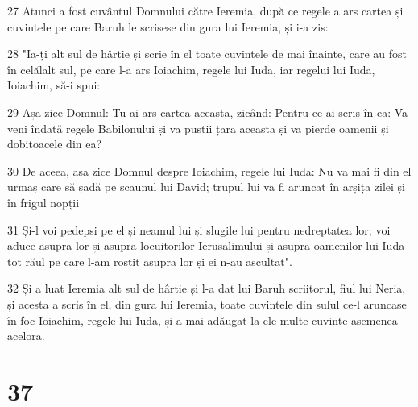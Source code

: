 \par 27 Atunci a fost cuvântul Domnului către Ieremia, după ce regele a ars cartea și cuvintele pe care Baruh le scrisese din gura lui Ieremia, și i-a zis:
\par 28 "Ia-ți alt sul de hârtie și scrie în el toate cuvintele de mai înainte, care au fost în celălalt sul, pe care l-a ars Ioiachim, regele lui Iuda, iar regelui lui Iuda, Ioiachim, să-i spui:
\par 29 Așa zice Domnul: Tu ai ars cartea aceasta, zicând: Pentru ce ai scris în ea: Va veni îndată regele Babilonului și va pustii țara aceasta și va pierde oamenii și dobitoacele din ea?
\par 30 De aceea, așa zice Domnul despre Ioiachim, regele lui Iuda: Nu va mai fi din el urmaș care să șadă pe scaunul lui David; trupul lui va fi aruncat în arșița zilei și în frigul nopții
\par 31 Și-l voi pedepsi pe el și neamul lui și slugile lui pentru nedreptatea lor; voi aduce asupra lor și asupra locuitorilor Ierusalimului și asupra oamenilor lui Iuda tot răul pe care l-am rostit asupra lor și ei n-au ascultat".
\par 32 Și a luat Ieremia alt sul de hârtie și l-a dat lui Baruh scriitorul, fiul lui Neria, și acesta a scris în el, din gura lui Ieremia, toate cuvintele din sulul ce-l aruncase în foc Ioiachim, regele lui Iuda, și a mai adăugat la ele multe cuvinte asemenea acelora.

\chapter{37}

